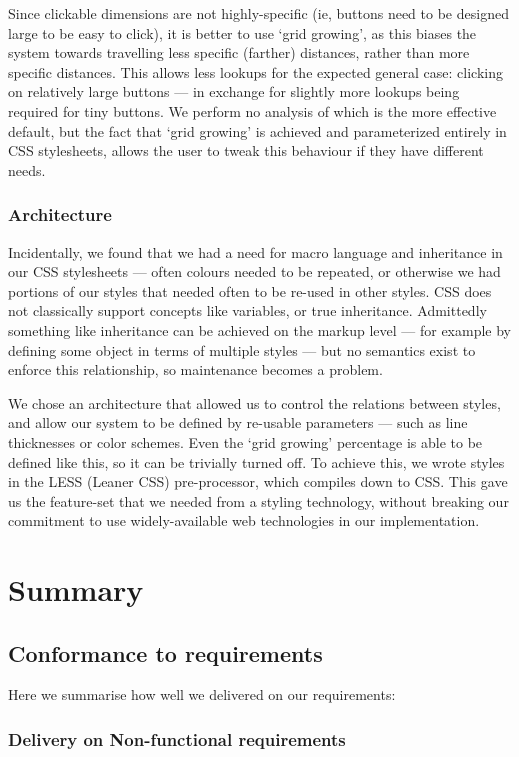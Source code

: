 \documentclass[a4paper, 12pt]{report}
\begin{document}
Since clickable dimensions are not highly-specific (ie, buttons need to be designed large to be easy to click), it is better to use `grid growing', as this biases the system towards travelling less specific (farther) distances, rather than more specific distances. This allows less lookups for the expected general case: clicking on relatively large buttons --- in exchange for slightly more lookups being required for tiny buttons. We perform no analysis of which is the more effective default, but the fact that `grid growing' is achieved and parameterized entirely in CSS stylesheets, allows the user to tweak this behaviour if they have different needs.

\subsubsection{Architecture}
Incidentally, we found that we had a need for macro language and inheritance in our CSS stylesheets --- often colours needed to be repeated, or otherwise we had portions of our styles that needed often to be re-used in other styles. CSS does not classically support concepts like variables, or true inheritance. Admittedly something like inheritance can be achieved on the markup level --- for example by defining some object in terms of multiple styles --- but no semantics exist to enforce this relationship, so maintenance becomes a problem.

We chose an architecture that allowed us to control the relations between styles, and allow our system to be defined by re-usable parameters --- such as line thicknesses or color schemes. Even the `grid growing' percentage is able to be defined like this, so it can be trivially turned off. To achieve this, we wrote styles in the LESS (Leaner CSS)\cite{lesscss} pre-processor, which compiles down to CSS. This gave us the feature-set that we needed from a styling technology, without breaking our commitment to use widely-available web technologies in our implementation.

\section{Summary}
\subsection{Conformance to requirements}
Here we summarise how well we delivered on our requirements:

\subsubsection{Delivery on Non-functional requirements}
\end{document}
